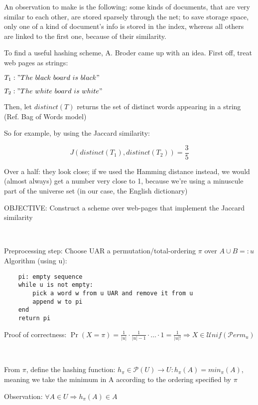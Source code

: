 \documentclass{report}
\begin{document}
	An observation to make is the following: some kinds of documents, that are very similar to each other, are stored sparsely through the net; to save storage space, only one of a kind of document's info is stored in the index, whereas all others are linked to the first one, because of their similarity.
	
	To find a useful hashing scheme, A. Broder came up with an idea. First off, treat web pages as strings:
	
	$T_1: "The\ black\ board\ is\ black"$
	
	$T_2: "The\ white\ board\ is\ white"$
	
	Then, let $distinct(T)$ returns the set of distinct words appearing in a string (Ref. Bag of Words model)
	
	So for example, by using the Jaccard similarity:
    
    \begin{equation}
    \displaystyle J(distinct(T_1), distinct(T_2))= \frac{3}{5}
    \end{equation}
	
	Over a half: they look close; if we used the Hamming distance instead, we would (almost always) get a number very close to 1, because we're using a minuscule part of the universe set (in our case, the English dictionary)
	
	OBJECTIVE: Construct a scheme over web-pages that implement the Jaccard similarity
	
	\
	
	Preprocessing step: Choose UAR a permutation/total-ordering $\pi$ over $A\cup B =: u$
	Algorithm (using u):
	
	\begin{verbatim}
	pi: empty sequence
	while u is not empty:
		pick a word w from u UAR and remove it from u
		append w to pi
	end
	return pi
	\end{verbatim}
	
	Proof of correctness: $\Pr(X = \pi) = \frac{1}{|u|}\cdot\frac{1}{|u|-1}\cdot\dots\cdot 1 = \frac{1}{|u|!} \Rightarrow X \in \mathcal{U}nif(\mathcal{P}erm_u)$
	
	\
	
	From $\pi$, define the hashing function: $h_{\pi} \in \mathcal{P}(U) \to U : h_{\pi}(A) = min_{\pi}(A)$, meaning we take the minimum in A according to the ordering specified by $\pi$
	
	Observation: $\forall A \in U \Rightarrow h_{\pi}(A) \in A$
	
	\
	
\end{document}
